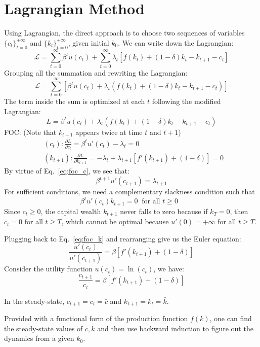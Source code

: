 \documentclass[11pt,a4paper]{book}
\theoremstyle{definition}\newtheorem{definition}{Definition}
\theoremstyle{definition}\newtheorem{fact}{Fact}
\theoremstyle{definition}\newtheorem{remark}{Remark}
\theoremstyle{definition}\newtheorem{ex}{Ex.}
\theoremstyle{definition}\newtheorem{project}{Project}
\theoremstyle{definition}\newtheorem{problem}{Problem}
\theoremstyle{definition}\newtheorem{example}{Example}
\numberwithin{theorem}{section}
\numberwithin{corollary}{chapter}
\numberwithin{assumption}{chapter}
\numberwithin{definition}{chapter}
\numberwithin{prop}{chapter}
\numberwithin{notation}{chapter}
\numberwithin{problem}{chapter}
\numberwithin{example}{chapter}
\numberwithin{fact}{chapter}
\numberwithin{ex}{chapter}
\begin{document}
	\section{Lagrangian Method}
	Using Lagrangian, the direct approach is to choose two sequences of variables $\{c_t\}^{+\infty}_{t=0}$ and $\{k_t\}^{+\infty}_{t=0}$, given initial $k_0$.
	We can write down the Lagrangian:
$$
    \mathcal{L} = \sum_{t=0}^{\infty} \beta^t u(c_t) + \sum_{t=0}^{\infty} \lambda_t \left[ f(k_t) + (1- \delta) k_t - k_{t+1} - c_t \right]
$$
Grouping all the summation and rewriting the Lagrangian:
$$
    \mathcal{L} = \sum_{t=0}^{\infty} \left[ \beta^t u(c_t) + \lambda_t \left( f(k_t) + (1- \delta)k_t - k_{t+1} - c_t \right) \right]
$$
The term inside the sum is optimized at each $t$ following the modified Lagrangian:
$$
    L = \beta^t u(c_t) + \lambda_t \left( f(k_t) + (1- \delta) k_t - k_{t+1} - c_t \right)
$$
FOC: (Note that $k_{t+1}$ appears twice at time $t$ and $t+1$)
\begin{align}
      &(c_t): \frac{\partial L}{\partial c_t} = \beta^t u'(c_t) - \lambda_t = 0  \label{eq:foc_c}  \ \                                                \\
      &(k_{t+1}): \frac{\partial L}{\partial k_{t+1}} = -\lambda_t + \lambda_{t+1} \left[ f'(k_{t+1}) + (1-\delta) \right] = 0 \label{eq:foc_k} \ 
\end{align}
By virtue of Eq.~\eqref{eq:foc_c}, we see that:
$$
    \beta^{t+1}u'(c_{t+1}) = \lambda_{t+1}
$$
For sufficient conditions, we need a complementary slackness condition such that 
$$
	\beta^t u'(c_t) k_{t+1} = 0 \ \text{ for all $t\geq 0$ }
$$
Since $c_t \geq 0$, the capital wealth $k_{t+1}$ never falls to zero because if $k_T = 0$, then $c_t = 0$ for all $t\geq T$, which cannot be optimal because $u'(0) = +\infty$ for all $t\geq T$. 

Plugging back to Eq.~\eqref{eq:foc_k} and rearranging give us the Euler equation:
$$
    \frac{u'(c_t)}{u'(c_{t+1})} = \beta \left[ f'(k_{t+1}) + (1-\delta) \right]
$$
Consider the utility function $u(c_t) = \ln(c_t)$, we have:
$$
    \frac{c_{t+1}}{c_t} = \beta \left[f'(k_{t+1}) + (1-\delta)\right]
$$

In the steady-state, $c_{t+1} = c_t = \bar{c}$ and $k_{t+1} = k_t = \bar{k}$.  

Provided with a functional form of the production function $f(k)$, one can find the steady-state values of $\bar{c}, \bar{k}$ and then use backward induction to figure out the dynamics from a given $k_0$.
	
\end{document}
